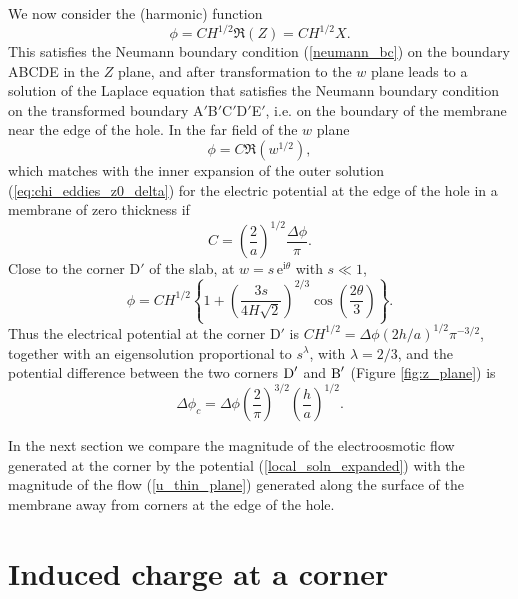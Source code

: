 We now consider the (harmonic) function
\begin{equation}
\phi=CH^{1/2}\Re(Z)=CH^{1/2}X.
\end{equation}
This satisfies the Neumann boundary condition (\ref{neumann_bc})
on the boundary ABCDE
in the $Z$ plane, and after transformation to the $w$ plane leads to a
solution \cite{M&F} of the Laplace equation
that satisfies the Neumann boundary
condition on the transformed boundary
A$'$B$'$C$'$D$'$E$'$, i.e. on the
boundary of the membrane near the
edge of the hole.
In the far field of the $w$ plane
\begin{equation}
\phi=C\Re(w^{1/2}),
\end{equation}
which matches with the inner expansion of the outer solution
(\ref{eq:chi_eddies_z0_delta}) for the electric potential
at the edge of the hole in a membrane
of zero thickness if
\begin{equation}
C=\left(\frac{2}{a}\right)^{1/2}\frac{\Delta\phi}{\pi}.
\end{equation}
Close to the corner D$'$ of the slab, at $w=s\,\text{e}^{\text{i}\theta}$
with $s\ll 1$,
\begin{equation}
\phi=CH^{1/2}\left\lbrace 1+\left(\frac{3s}{4H\sqrt2}\right)^{2/3}
\cos\left(\frac{2\theta}{3}\right)
\right\rbrace.
\label{local_soln_expanded}
\end{equation}
Thus the electrical potential at the corner D$'$ is
$CH^{1/2}=\Delta\phi (2h/a)^{1/2} \pi^{-3/2}$, together with an eigensolution
proportional to $s^\lambda$,
with $\lambda=2/3$, and
the potential difference between the two corners $\text D'$ and $\text B'$
(Figure \ref{fig:z_plane}) is
\begin{equation}
\Delta\phi_c=\Delta\phi\left(\frac{2}{\pi}\right)^{3/2}\left(\frac{h}{a}\right)^{1/2}.
\label{delta_phi_c}
\end{equation}

In the next section we compare the magnitude of the electroosmotic flow
generated at the corner by the potential (\ref{local_soln_expanded})
with the magnitude of the flow (\ref{u_thin_plane}) generated along the
surface of the membrane away from corners at the edge of the hole.

\section{Induced charge at a corner \label{sec:corner_charge}}


